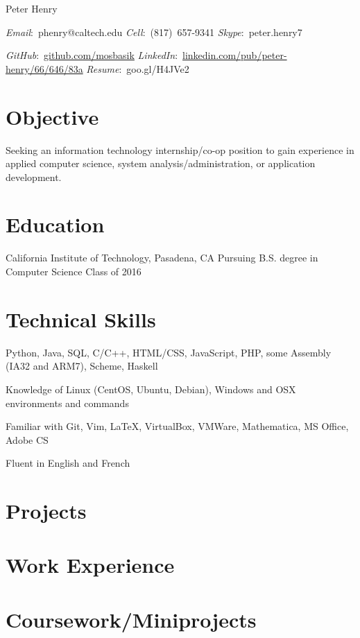 \documentclass[10pt,letterpaper, full, draft]{article}
\newcommand{\keyvalue}[2]{\mbox{\emph{#1}: #2}}
\begin{document}
\noindent
\begin{minipage}[c]{.33\textwidth}
	\huge Peter Henry
\end{minipage}%
\begin{minipage}[c]{.33\textwidth}
	\keyvalue{Email}{phenry@caltech.edu}
	\keyvalue{Cell}{(817) 657-9341}
	\keyvalue{Skype}{peter.henry7}
\end{minipage}%
\begin{minipage}[c]{.33\textwidth}
	\keyvalue{GitHub}{\href{http://github.com/mosbasik}{github.com/mosbasik}}
	\keyvalue{LinkedIn}{\href{http://linkedin.com/pub/peter-henry/66/646/83a}{linkedin.com/pub/peter-henry/66/646/83a}}
	\keyvalue{Resume}{goo.gl/H4JVe2}
\end{minipage}%


\section{Objective}

Seeking an information technology internship/co-op position to gain experience in applied computer science, system analysis/administration, or application development.

\section{Education}

California Institute of Technology, Pasadena, CA \newline
Pursuing B.S. degree in Computer Science \newline
Class of 2016

\section{Technical Skills}

Python, Java, SQL, C/C++, HTML/CSS, JavaScript, PHP, some Assembly (IA32 and ARM7), Scheme, Haskell

Knowledge of Linux (CentOS, Ubuntu, Debian), Windows and OSX environments and commands

Familiar with Git, Vim, LaTeX, VirtualBox, VMWare, Mathematica, MS Office, Adobe CS

Fluent in English and French

\section{Projects}

\section{Work Experience}

\section{Coursework/Miniprojects}
\end{document}
